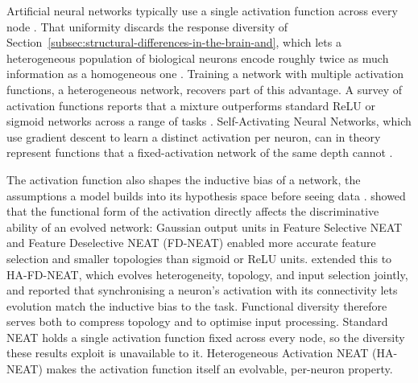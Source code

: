 \documentclass[12pt]{article}
\newcommand{\revAcro}[2]{#2}
\begin{document}
Artificial neural networks typically use a single activation function across every node \parencite{dubey_activation_2022}.
That uniformity discards the response diversity of Section~\ref{subsec:structural-differences-in-the-brain-and}, which lets a heterogeneous population of biological neurons encode roughly twice as much information as a homogeneous one \parencite{padmanabhan_intrinsic_2010}.
Training a network with multiple activation functions, a heterogeneous network, recovers part of this advantage.
A survey of activation functions reports that a mixture outperforms standard ReLU or sigmoid networks across a range of tasks \parencite{dubey_activation_2022}. \revAcro{A-05}{Self-Activating Neural Networks}, which use gradient descent to learn a distinct activation per neuron, can in theory represent functions that a fixed-activation network of the same depth cannot \parencite{tutuncuoglu_neuronlevel_2025}.

The activation function also shapes the inductive bias of a network, the assumptions a model builds into its hypothesis space before seeing data \parencite{papavasileiou_importance_2017}.
\textcite{papavasileiou_importance_2017} showed that the functional form of the activation directly affects the discriminative ability of an evolved network: Gaussian output units in \revAcro{A-06}{Feature Selective NEAT} and \revAcro{A-07}{Feature Deselective NEAT (FD-NEAT)} enabled more accurate feature selection and smaller topologies than sigmoid or ReLU units.
\textcite{papavasileiou_optimizing_2022} extended this to HA-FD-NEAT, which evolves heterogeneity, topology, and input selection jointly, and reported that synchronising a neuron's activation with its connectivity lets evolution match the inductive bias to the task.
Functional diversity therefore serves both to compress topology and to optimise input processing.
Standard NEAT holds a single activation function fixed across every node, so the diversity these results exploit is unavailable to it.
Heterogeneous Activation NEAT (HA-NEAT) makes the activation function itself an evolvable, per-neuron property.




\end{document}
